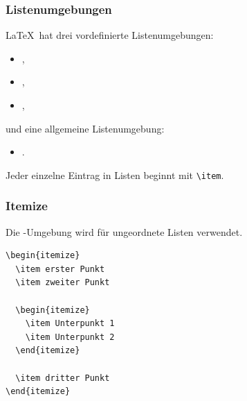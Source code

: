 \begin{frame}[fragile]
\frametitle{Listenumgebungen}

\LaTeX\ hat drei vordefinierte Listenumgebungen:
\begin{itemize}
	\item {},
	\item {},
	\item {},
\end{itemize}

\noindent und eine allgemeine Listenumgebung:
\begin{itemize}
	\item {}.
\end{itemize}

Jeder einzelne Eintrag in Listen beginnt mit \lstinline|\item|.  
\end{frame}

\begin{frame}[fragile]
\frametitle{Itemize}

Die -Umgebung wird für ungeordnete Listen verwendet. 

\begin{multicols}{2}
\begin{lstlisting}
\begin{itemize}
  \item erster Punkt
  \item zweiter Punkt

  \begin{itemize}
    \item Unterpunkt 1
    \item Unterpunkt 2
  \end{itemize}

  \item dritter Punkt
\end{itemize}
\end{lstlisting}
\columnbreak{}
\end{multicols}

\end{frame}

